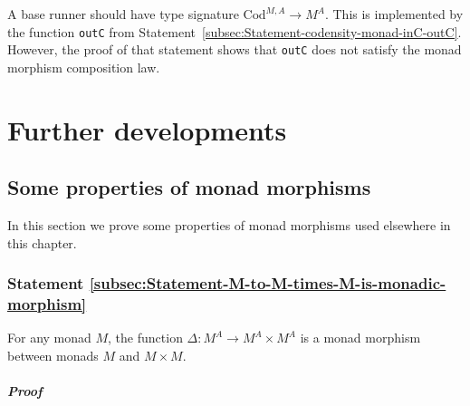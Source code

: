 A base runner should have type signature $\text{Cod}^{M,A}\rightarrow M^{A}$.
This is implemented by the function \lstinline!outC! from Statement~\ref{subsec:Statement-codensity-monad-inC-outC}.
However, the proof of that statement shows that \lstinline!outC!
does not satisfy the monad morphism composition law.

\section{Further developments}

\subsection{Some properties of monad morphisms}

In this section we prove some properties of monad morphisms used elsewhere
in this chapter.

\subsubsection{Statement \label{subsec:Statement-M-to-M-times-M-is-monadic-morphism}\ref{subsec:Statement-M-to-M-times-M-is-monadic-morphism}}

For any monad $M$, the function $\Delta:M^{A}\rightarrow M^{A}\times M^{A}$
is a monad morphism between monads $M$ and $M\times M$.

\subparagraph{Proof}

